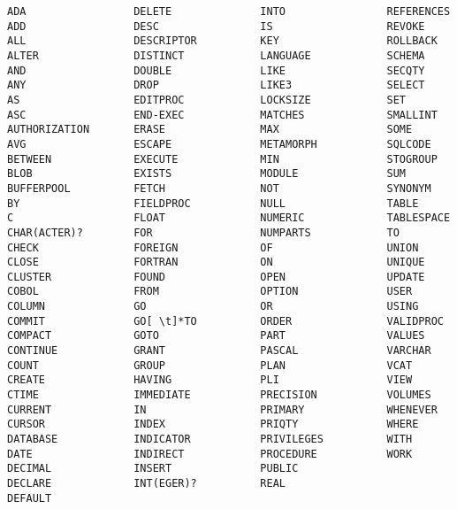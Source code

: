 \begin{verbatim}
ADA                 DELETE              INTO                REFERENCES
ADD                 DESC                IS                  REVOKE
ALL                 DESCRIPTOR          KEY                 ROLLBACK
ALTER               DISTINCT            LANGUAGE            SCHEMA
AND                 DOUBLE              LIKE                SECQTY
ANY                 DROP                LIKE3               SELECT
AS                  EDITPROC            LOCKSIZE            SET
ASC                 END-EXEC            MATCHES             SMALLINT
AUTHORIZATION       ERASE               MAX                 SOME
AVG                 ESCAPE              METAMORPH           SQLCODE
BETWEEN             EXECUTE             MIN                 STOGROUP
BLOB                EXISTS              MODULE              SUM
BUFFERPOOL          FETCH               NOT                 SYNONYM
BY                  FIELDPROC           NULL                TABLE
C                   FLOAT               NUMERIC             TABLESPACE
CHAR(ACTER)?        FOR                 NUMPARTS            TO
CHECK               FOREIGN             OF                  UNION
CLOSE               FORTRAN             ON                  UNIQUE
CLUSTER             FOUND               OPEN                UPDATE
COBOL               FROM                OPTION              USER
COLUMN              GO                  OR                  USING
COMMIT              GO[ \t]*TO          ORDER               VALIDPROC
COMPACT             GOTO                PART                VALUES
CONTINUE            GRANT               PASCAL              VARCHAR
COUNT               GROUP               PLAN                VCAT
CREATE              HAVING              PLI                 VIEW
CTIME               IMMEDIATE           PRECISION           VOLUMES
CURRENT             IN                  PRIMARY             WHENEVER
CURSOR              INDEX               PRIQTY              WHERE
DATABASE            INDICATOR           PRIVILEGES          WITH
DATE                INDIRECT            PROCEDURE           WORK
DECIMAL             INSERT              PUBLIC
DECLARE             INT(EGER)?          REAL
DEFAULT
\end{verbatim}




